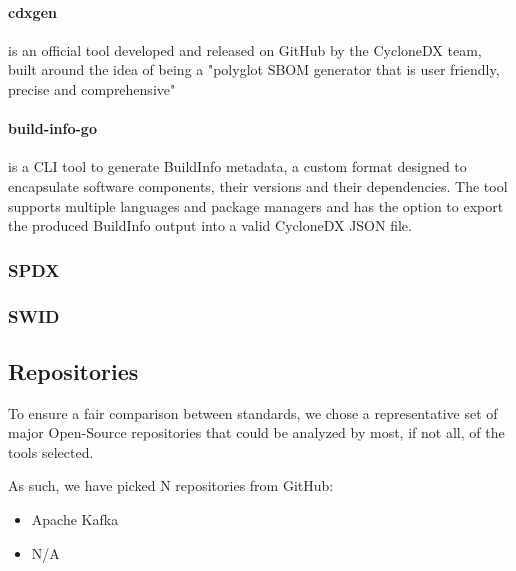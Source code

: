 \paragraph{cdxgen} is an official tool developed and released on GitHub by the CycloneDX team, built around the idea of being a "polyglot SBOM generator that is user friendly, precise and comprehensive"

\paragraph{build-info-go} is a CLI tool to generate BuildInfo metadata, a custom format designed to encapsulate software components, their versions and their dependencies. The tool supports multiple languages and package managers and has the option to export the produced BuildInfo output into a valid CycloneDX JSON file.

\subsubsection{SPDX}
\subsubsection{SWID}


\subsection{Repositories} \label{methodology:repositories}

To ensure a fair comparison between standards, we chose a representative set of major Open-Source repositories that could be analyzed by most, if not all, of the tools selected.

As such, we have picked N repositories from GitHub:

\begin{itemize}
    \item Apache Kafka \cite{repository:dataset:kafka}
    \item N/A
\end{itemize}